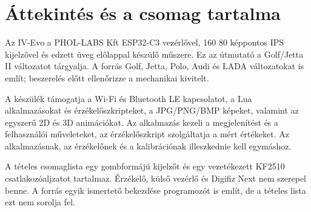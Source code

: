 \chapter{Áttekintés és a csomag tartalma}
Az IV-Evo a PHOL-LABS Kft ESP32-C3 vezérlővel, 160\,\texttimes\,80 képpontos IPS kijelzővel és edzett üveg előlappal készülő műszere. Ez az útmutató a Golf/Jetta II változatot tárgyalja. A forrás Golf, Jetta, Polo, Audi és LADA változatokat is említ; beszerelés előtt ellenőrizze a mechanikai kivitelt.

A készülék támogatja a Wi-Fi és Bluetooth LE kapcsolatot, a Lua alkalmazásokat és érzékelőszkripteket, a JPG/PNG/BMP képeket, valamint az egyszerű 2D és 3D animációkat. Az alkalmazás kezeli a megjelenítést és a felhasználói műveleteket, az érzékelőszkript szolgáltatja a mért értékeket. Az alkalmazásnak, az érzékelőnek és a kalibrációnak illeszkednie kell egymáshoz.

A tételes csomaglista egy gombformájú kijelzőt és egy vezetékezett KF2510 csatlakozóaljzatot tartalmaz. Érzékelő, külső vezérlő és Digifiz Next nem szerepel benne. A forrás egyik ismertető bekezdése programozót is említ, de a tételes lista ezt nem sorolja fel.
